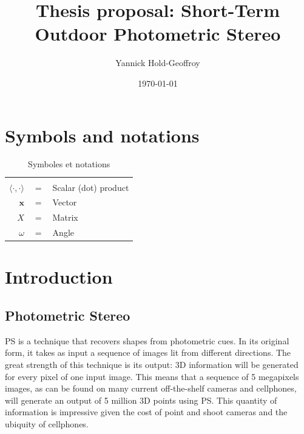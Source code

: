 \documentclass{report}
\title{Thesis proposal: Short-Term Outdoor Photometric Stereo}
\author{Yannick Hold-Geoffroy}
\date{\today}
\begin{document}

\maketitle

\tableofcontents

\newcommand{\boldomega}{\boldsymbol \omega} %
\newcommand{\boldmu}{\boldsymbol \mu} %
\newcommand{\bolddelta}{\boldsymbol \delta} %

\graphicspath{{figures/}}


\chapter*{Symbols and notations}

\begin{table}[htbp]\caption{Symboles et notations}
\centering %
\begin{tabular}{r c p{10cm} }

\hline & & \\
$\langle \cdot, \cdot \rangle$      & $=$ & Scalar (dot) product \\
$\mathbf{x}$                        & $=$ & Vector \\
$X$                                 & $=$ & Matrix \\
$\omega$                            & $=$ & Angle \\
\hline
\end{tabular}
\label{tab:TableOfNotationForMyResearch}
\end{table}



\chapter{Introduction}



\section{Photometric Stereo}


PS is a technique that recovers shapes from photometric cues. In its original form, it takes as input a sequence of images lit from different directions. The great strength of this technique is its output: 3D information will be generated for every pixel of one input image. This means that a sequence of 5 megapixels images, as can be found on many current off-the-shelf cameras and cellphones, will generate an output of 5 million 3D points using PS. This quantity of information is impressive given the cost of point and shoot cameras and the ubiquity of cellphones.
\end{document}
